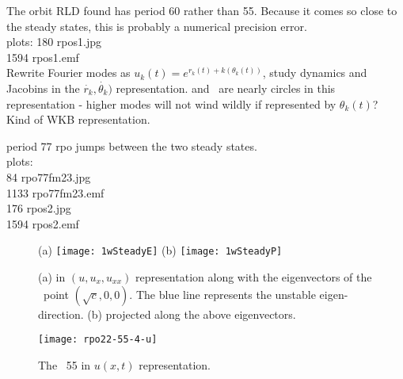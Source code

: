 The orbit RLD found has period 60
rather than 55.  Because it comes so close to the steady states,
this is probably a numerical precision error.
\\
plots:
 180 rpos1.jpg  \\
1594 rpos1.emf  \\


Rewrite Fourier modes as $u_k(t) = e^{r_k(t) + k(\theta_k(t))}$, study
dynamics and Jacobins in the $\dot{r_k},\dot{\theta_k})$ representation.
 and  \eqva\ are nearly circles in this representation - higher
modes will not wind wildly if represented by $\theta_k(t)$? Kind of WKB
representation.

period 77 rpo jumps between the two steady states.
\\
plots:  \\
  84 rpo77fm23.jpg  \\
1133 rpo77fm23.emf  \\
 176 rpos2.jpg  \\
1594 rpos2.emf  \\


\bigskip

\begin{figure}[t]
\begin{center}
(a) \texttt{[image: 1wSteadyE]}
\hspace{0.1in}
(b) \texttt{[image: 1wSteadyP]}
\end{center}
\caption[EQV{1} visualization]
        {
(a)  in $(u,u_x,u_{xx})$ representation along with the eigenvectors of the \eqv\
point $(\sqrt{c},0,0)$. The blue line represents the unstable eigen-direction.
(b) \EQV{1} projected along the above eigenvectors.
        }
\label{f:1wSteady}
\end{figure}


\begin{figure}[t]
\begin{center}
    \texttt{[image: rpo22-55-4-u]}
\end{center}
\caption[The \rpo\ T=55 in  u(x,t)  representation]
        {
 The \rpo\ {\nameit}55 in $u(x,t)$ representation.
        }
\label{f:rpo55u}
\end{figure}




